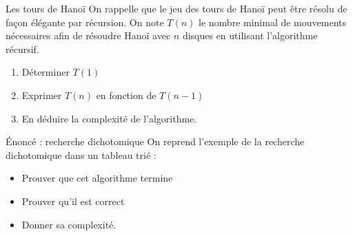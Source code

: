 \documentclass[10pt]{beamer}
\begin{document}
\begin{frame}[fragile]{\Ctitle}{\stitle}
	\begin{exampleblock}{Les tours de Hanoï}
		On rappelle que le jeu des tours de Hanoï peut être résolu de façon élégante par récursion. On note $T(n)$ le nombre minimal de mouvements nécessaires afin de résoudre Hanoï avec $n$ disques en utilisant l'algorithme récursif.
		\begin{enumerate}
			\item Déterminer $T(1)$
			\item Exprimer $T(n)$ en fonction de $T(n-1)$
			\item En déduire la complexité de l'algorithme.
		\end{enumerate}
	\end{exampleblock}
\end{frame}



\begin{frame}[fragile]{\Ctitle}{\stitle}
	\begin{exampleblock}{Énoncé : recherche dichotomique}
		On reprend l'exemple de la recherche dichotomique dans un tableau trié :
		\begin{itemize}
			\item<2-> Prouver que cet algorithme termine
			\item<3-> Prouver qu'il est correct
			\item<4-> Donner sa complexité.
		\end{itemize}
	\end{exampleblock}
\end{frame}
\end{document}
